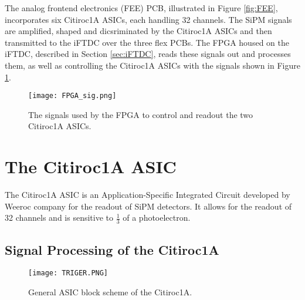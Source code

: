 The analog frontend electronics (FEE) PCB, illustrated in Figure \ref{fig:FEE}, incorporates six Citiroc1A ASICs, each handling 32 channels.
The SiPM signals are amplified, shaped and dicsriminated by the Citiroc1A ASICs  and then transmitted to the iFTDC over the three flex PCBs.
\newline
The FPGA housed on the iFTDC, described in Section \ref{sec:iFTDC},
reads these signals out and processes them, as well as controlling the Citiroc1A ASICs with the signals shown in Figure \ref{fig:FPGA_sigs}.\autocite{InternalcommunicationIgor}
\begin{figure}[H]
    \centering
    \texttt{[image: FPGA\_sig.png]}
    \caption{The signals used by the FPGA to control and readout the two Citiroc1A ASICs.\autocite{datasheetCITIROC}}
    \label{fig:FPGA_sigs}
\end{figure}


\section{The Citiroc1A ASIC}
The Citiroc1A ASIC is an Application-Specific Integrated Circuit developed by Weeroc company for the readout of SiPM detectors.
It allows for the readout of 32 channels and is sensitive to $\frac{1}{3}$ of a photoelectron.\autocite{datasheetCITIROC}
\subsection{Signal Processing of the Citiroc1A}
\begin{figure}[h]
    \centering
    \texttt{[image: TRIGER.PNG]}
    \caption{General ASIC block scheme of the Citiroc1A.\autocite{datasheetCITIROC}}
    \label{fig:CITIROC1A_TRIGEER}
\end{figure}

